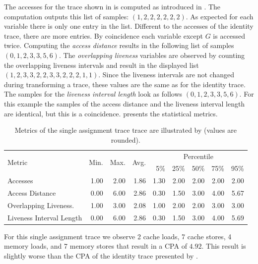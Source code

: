 \documentclass[onecolumn, openright, master, english, signatures]{dbrgrptt}
\begin{document}
The accesses for the \ac{trace} shown in  is computed as introduced in .
The computation outputs this list of samples: $(1, 2, 2, 2, 2, 2, 2)$.
As expected for each variable there is only one entry in the list.
Different to the accesses of the identity \ac{trace}, there are more entries.
By coincidence each variable except $G$ is accessed twice.
Computing the \emph{access distance} results in the following list of samples $(0, 1, 2, 3, 3, 5, 6)$.
The \emph{overlapping liveness} variables are observed by counting the overlapping liveness intervals and result in the displayed list $(1, 2, 3, 3, 2, 2, 3, 3, 2, 2, 2, 1, 1)$.
Since the liveness intervals are not changed during transforming a \ac{trace}, these values are the same as for the identity \ac{trace}.
The samples for the \emph{liveness interval length} look as follows $(0, 1, 2, 3, 3, 5, 6)$.
For this example the samples of the access distance and the liveness interval length are identical, but this is a coincidence.
 presents the statistical metrics.

\begin{table}[!ht]
  \centering
  \begin{tabular}{lrrrrrrrr}
    \hline
    \multirow{2}{*}{Metric} & \multirow{2}{*}{Min.} & \multirow{2}{*}{Max.} & \multirow{2}{*}{Avg.} & \multicolumn{5}{c}{Percentile} \tabularnewline
    & & & & 5\% & 25\% & 50\% & 75\% & 95\% \tabularnewline
    \hline
    Accesses                 & 1.00 & 2.00 & 1.86 & 1.30 & 2.00 & 2.00 & 2.00 & 2.00 \\
    Access Distance          & 0.00 & 6.00 & 2.86 & 0.30 & 1.50 & 3.00 & 4.00 & 5.67 \\
    Overlapping Liveness.    & 1.00 & 3.00 & 2.08 & 1.00 & 2.00 & 2.00 & 3.00 & 3.00 \\
    Liveness Interval Length & 0.00 & 6.00 & 2.86 & 0.30 & 1.50 & 3.00 & 4.00 & 5.69 \\
    \hline
  \end{tabular}
  \caption{Metrics of the single assignment trace \ac{trace} are illustrated by  (values are rounded).}
  \label{tab:summarizing-example-metrics-sa}
\end{table}

For this single assignment trace we observe 2 cache loads, 7 cache stores, 4 memory loads, and 7 memory stores that result in a \ac{CPA} of $4.92$.
This result is slightly worse than the \ac{CPA} of the identity \ac{trace} presented by .
\end{document}
